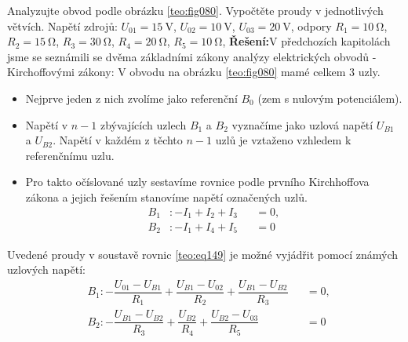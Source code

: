 \begin{mdframed}[style=mdexam]
  \begin{example}\label{TEO:exam020}
    Analyzujte obvod podle obrázku \ref{teo:fig080}. Vypočtěte proudy v jednotlivých větvích. Napětí
    zdrojů: \(U_{01} = \SI{15}{\V}\), \(U_{02} = \SI{10}{\V}\), \(U_{03} = \SI{20}{\V}\), odpory
    \(R_1 = \SI{10}{\ohm}\), \(R_2 = \SI{15}{\ohm}\), \(R_3 = \SI{30}{\ohm}\), \(R_4 =
    \SI{20}{\ohm}\), \(R_5 = \SI{10}{\ohm}\),
    \newline 
    \textbf{Řešení:}\newline V předchozích kapitolách jsme se seznámili se dvěma základními zákony
    analýzy elektrických obvodů - Kirchoffovými zákony: V obvodu na obrázku \ref{teo:fig080} mamé
    celkem 3 uzly. 
    \begin{itemize}[leftmargin=2em]
      \item Nejprve jeden z nich zvolíme jako referenční  \(B_0\) (zem s nulovým potenciálem). 
      \item Napětí v \(n-1\) zbývajících uzlech \(B_1\) a \(B_2\) vyznačíme jako uzlová napětí
            \(U_{B1}\) a \(U_{B2}\). Napětí v každém z těchto \(n-1\) uzlů je vztaženo vzhledem k
            referenčnímu uzlu. 
      \item Pro takto očíslované uzly sestavíme rovnice podle prvního Kirchhoffova zákona a jejich
            řešením stanovíme napětí označených uzlů.
            \begin{subequations}\label{teo:eq149}
              \begin{alignat}{2}
                B_1&: -I_1 + I_2 + I_3 &&=0,  \label{teo:eq149a}   \\
                B_2&: -I_1 + I_4 + I_5 &&=0   \label{teo:eq149b} 
              \end{alignat}
            \end{subequations}  
    \end{itemize}
    Uvedené proudy v soustavě rovnic \ref{teo:eq149} je možné vyjádřit pomocí známých uzlových
    napětí:
    \begin{subequations}\label{teo:eq150}
      \begin{alignat}{2}
        &B_1: - \dfrac{U_{01} - U_{B1}}{R_1} 
              + \dfrac{U_{B1} - U_{02}}{R_2} 
              + \dfrac{U_{B1} - U_{B2}}{R_3}       &&=0,  \label{teo:eq150a}   \\
        &B_2: - \dfrac{U_{B1} - U_{B2}}{R_3} 
              + \dfrac{U_{B2}}{R_4}
              + \dfrac{U_{B2} - U_{03}}{R_5}       &&=0   \label{teo:eq150b} 

\end{alignat}
\end{subequations}
\end{example}
\end{mdframed}
